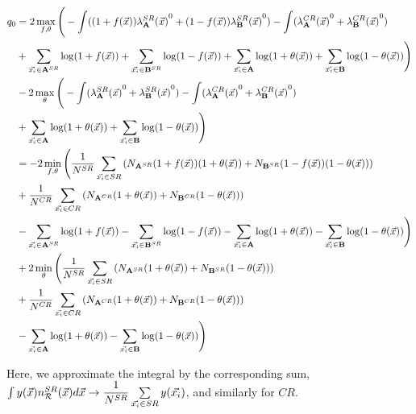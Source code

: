 \documentclass[paper/ddppaper2.tex]{subfiles}
\begin{document}
\begin{wideequations}
\begin{equation}
\begin{aligned}
{q_{0}} &= 2 \max\limits_{f, {\theta}} \Bigg(
    - \int ((1 + f(\vec{{x}})){{\lambda}_{{\mathbf{A}}}^{SR}(\vec{{x}})}^0 + (1 - f(\vec{{x}})){{\lambda}_{{\mathbf{B}}}^{SR}(\vec{{x}})}^0)
    - \int ({{\lambda}_{{\mathbf{A}}}^{CR}(\vec{{x}})}^0 + {{\lambda}_{{\mathbf{B}}}^{CR}(\vec{{x}})}^0)
    \\&
    + \sum\limits_{{\vec{{x}_i}} \in {{\mathbf{A}}^{SR}}} \log (1 + f(\vec{{x}}))
    + \sum\limits_{{\vec{{x}_i}} \in {{\mathbf{B}}^{SR}}} \log (1 - f(\vec{{x}}))
    + \sum\limits_{{\vec{{x}_i}} \in {\mathbf{A}}} \log(1 + {{\theta}(\vec{{x}})})
    + \sum\limits_{{\vec{{x}_i}} \in {\mathbf{B}}} \log(1 - {{\theta}(\vec{{x}})})
\Bigg)
\\&
- 2 \max\limits_{{\theta}} \Bigg(
    - \int ({{\lambda}_{{\mathbf{A}}}^{SR}(\vec{{x}})}^0 + {{\lambda}_{{\mathbf{B}}}^{SR}(\vec{{x}})}^0)
    - \int ({{\lambda}_{{\mathbf{A}}}^{CR}(\vec{{x}})}^0 + {{\lambda}_{{\mathbf{B}}}^{CR}(\vec{{x}})}^0)
    \\&
    + \sum\limits_{{\vec{{x}_i}} \in {\mathbf{A}}} \log(1 + {{\theta}(\vec{{x}})})
    + \sum\limits_{{\vec{{x}_i}} \in {\mathbf{B}}} \log(1 - {{\theta}(\vec{{x}})})
\Bigg) \\
&= - 2 \min\limits_{f, {\theta}} \Bigg(
    \dfrac{1}{N^{SR}} \sum\limits_{{\vec{{x}_i}} \in SR} \left(
        N_{{\mathbf{A}}^{SR}} (1 + f(\vec{{x}})) (1 + {{\theta}(\vec{{x}})})
        + N_{{\mathbf{B}}^{SR}}(1 - f(\vec{{x}})) (1 - {{\theta}(\vec{{x}})})
    \right)
    \\&
    + \dfrac{1}{N^{CR}} \sum\limits_{{\vec{{x}_i}} \in CR} \left(
        N_{{\mathbf{A}}^{CR}} (1 + {{\theta}(\vec{{x}})})
        + N_{{\mathbf{B}}^{CR}} (1 - {{\theta}(\vec{{x}})})
    \right)
    \\&
    - \sum\limits_{{\vec{{x}_i}} \in {{\mathbf{A}}^{SR}}} \log (1 + f(\vec{{x}}))
    - \sum\limits_{{\vec{{x}_i}} \in {{\mathbf{B}}^{SR}}} \log (1 - f(\vec{{x}}))
    - \sum\limits_{{\vec{{x}_i}} \in {\mathbf{A}}} \log(1 + {{\theta}(\vec{{x}})})
    - \sum\limits_{{\vec{{x}_i}} \in {\mathbf{B}}} \log(1 - {{\theta}(\vec{{x}})})
\Bigg)
\\&
+ 2 \min\limits_{{\theta}} \Bigg(
    \dfrac{1}{N^{SR}} \sum\limits_{{\vec{{x}_i}} \in SR} \left(
        N_{{\mathbf{A}}^{SR}} (1 + {{\theta}(\vec{{x}})})
        + N_{{\mathbf{B}}^{SR}}(1 - {{\theta}(\vec{{x}})})
    \right) \\&
    + \dfrac{1}{N^{CR}} \sum\limits_{{\vec{{x}_i}} \in CR} \left(
        N_{{\mathbf{A}}^{CR}} (1 + {{\theta}(\vec{{x}})})
        + N_{{\mathbf{B}}^{CR}}(1 - {{\theta}(\vec{{x}})})
    \right)
    \\&
    - \sum\limits_{{\vec{{x}_i}} \in {\mathbf{A}}} \log(1 + {{\theta}(\vec{{x}})})
    - \sum\limits_{{\vec{{x}_i}} \in {\mathbf{B}}} \log(1 - {{\theta}(\vec{{x}})})
\Bigg)
\end{aligned}
\end{equation}
\end{wideequations}

\noindent Here, we approximate the integral by the corresponding sum, $\int y(\vec{{x}}) n_{\mathcal{R}}^{SR}({\vec{{x}}}) d\vec{{x}} \to \dfrac{1}{N^{SR}} \sum\limits_{{\vec{{x}_i}} \in SR} y({\vec{{x}_i}})$, and similarly for $CR$.
\end{document}
